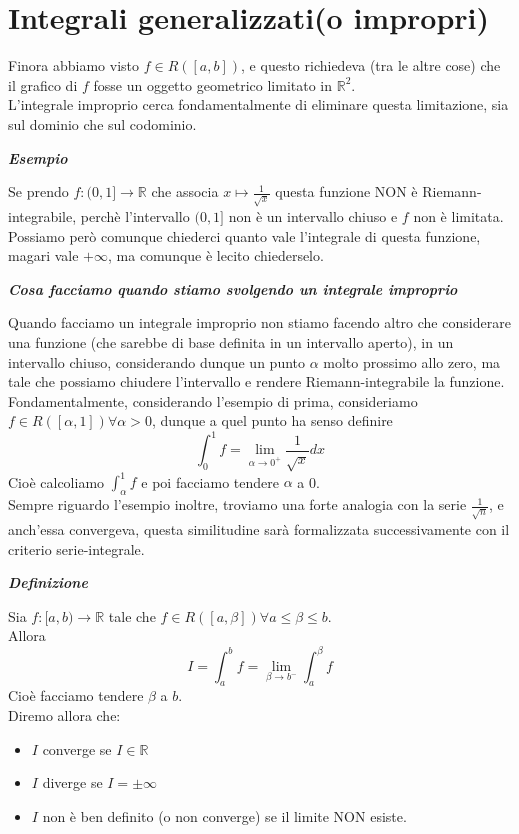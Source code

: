 \documentclass{article}
\theoremstyle{definition}
\newcommand{\R}{\mathbb{R}}
\begin{document}
\section{Integrali generalizzati(o impropri)}
Finora abbiamo visto $f \in R([a,b])$, e questo richiedeva (tra le altre cose) che il grafico di $f$ fosse un oggetto geometrico limitato in $\R^2$.
\\
L'integrale improprio cerca fondamentalmente di eliminare questa limitazione, sia sul dominio che sul codominio.
\\
\begin{center}
    \textbf{\textit{Esempio}}
\end{center}
Se prendo $f:(0,1] \to \R$ che associa $x \mapsto \frac{1}{\sqrt{x}}$ questa funzione NON è Riemann-integrabile, perchè l'intervallo $(0,1]$ non è un intervallo chiuso e $f$ non è limitata.
\\
Possiamo però comunque chiederci quanto vale l'integrale di questa funzione, magari vale $+\infty$, ma comunque è lecito chiederselo.
\newpage
\begin{center}
    \textbf{\textit{Cosa facciamo quando stiamo svolgendo un integrale improprio}}
\end{center}
Quando facciamo un integrale improprio non stiamo facendo altro che considerare una funzione (che sarebbe di base definita in un intervallo aperto), in un intervallo chiuso, considerando dunque un punto $\alpha$ molto prossimo allo zero, ma tale che possiamo chiudere l'intervallo e rendere Riemann-integrabile la funzione.
\\
Fondamentalmente, considerando l'esempio di prima, consideriamo $f \in R([\alpha,1]) \forall \alpha > 0$, dunque a quel punto ha senso definire
\begin{equation*}
    \int_0^1 f = \lim_{\alpha \to 0^+}\frac{1}{\sqrt{x}}dx
\end{equation*}
Cioè calcoliamo $\int_\alpha^1 f$ e poi facciamo tendere $\alpha$ a 0.
\\
Sempre riguardo l'esempio inoltre, troviamo una forte analogia con la serie $\frac{1}{\sqrt{n}}$, e anch'essa convergeva, questa similitudine sarà formalizzata successivamente con il criterio  serie-integrale.
\begin{center}
    \textbf{\textit{Definizione}}
\end{center}
Sia $f:[a,b) \to \R$ tale che $f \in R([a, \beta]) \forall a \leqslant \beta \leqslant b$.
\\
Allora
\begin{equation*}
    I=\int_a^b f = \lim_{\beta \to b^-}\int_a^\beta f
\end{equation*}
Cioè facciamo tendere $\beta$ a $b$.
\\
Diremo allora che:
\begin{itemize}
    \item $I$ converge se $I \in \R$
    \item $I$ diverge se $I=\pm \infty$
    \item $I$ non è ben definito (o non converge) se il limite NON esiste.
\end{itemize}
\end{document}

